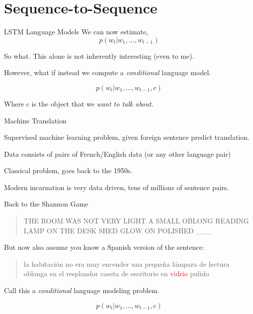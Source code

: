 \documentclass{beamer}
\let\tempone\itemize
\let\temptwo\enditemize
\renewenvironment{itemize}{\tempone\addtolength{\itemsep}{0.5\baselineskip}}{\temptwo}
\newcommand{\air}{\vspace{0.25cm}}
\begin{document}
\section{Sequence-to-Sequence}

\begin{frame}{LSTM Language Models}
   We can now estimate, 
  \[ p(w_t | w_1, \ldots, w_{t-1}) \]
  
  So what. This alone is not inherently interesting (even to me).
  \air 
  
  However, what if instead we compute a \textit{conditional} language model.

  \[ p(w_t | w_1, \ldots, w_{t-1}, c) \]

  Where $c$ is the object that we \textit{want to talk about}. 
\end{frame}

\begin{frame}{Machine Translation}
  \begin{itemize}
  \item Supervised machine learning problem, given foreign sentence predict translation.
    \air
  \item Data consists of pairs of French/English data (or any other language 
    pair)
    \air
  \item Classical problem, goes back to the 1950s.
    \air
  \item Modern incarnation is very data driven, tens of millions of sentence pairs.
  \end{itemize}
\end{frame}


\begin{frame}{Back to the Shannon Game}
    \begin{quote}
    THE ROOM WAS NOT VERY LIGHT A SMALL OBLONG READING LAMP ON THE
    DESK SHED GLOW ON POLISHED \_\_\_\
  \end{quote}
  \pause

  But now also assume you know a Spanish version of the sentence:
  \air 

  \begin{quote}
    la habitación no era muy encender una pequeña lámpara de lectura oblonga en el resplandor caseta de escritorio en \textcolor{red}{vidrio} pulido
  \end{quote}

  Call this a \textit{conditional} language modeling problem.

  \[ p(w_t | w_1, \ldots, w_{t-1}, c) \]
\end{frame}
\end{document}
